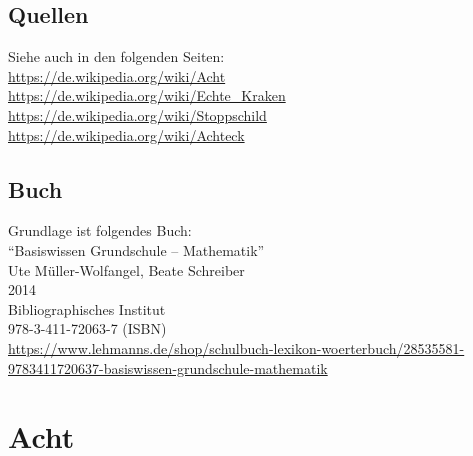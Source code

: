 \documentclass[a4paper]{amsart}
\theoremstyle{definition}
\begin{document}
\subsection*{Quellen}
Siehe auch in den folgenden Seiten:\\
\url{https://de.wikipedia.org/wiki/Acht}\\
\url{https://de.wikipedia.org/wiki/Echte_Kraken}\\
\url{https://de.wikipedia.org/wiki/Stoppschild}\\
\url{https://de.wikipedia.org/wiki/Achteck}

\subsection*{Buch}
Grundlage ist folgendes Buch:\\
"`Basiswissen Grundschule – Mathematik"'\\
Ute Müller-Wolfangel, Beate Schreiber\\
2014\\
Bibliographisches Institut\\
978-3-411-72063-7 (ISBN)
\\
\url{https://www.lehmanns.de/shop/schulbuch-lexikon-woerterbuch/28535581-9783411720637-basiswissen-grundschule-mathematik}

\section{Acht}
\def\kategoryVspace{5pt}

\end{document}
